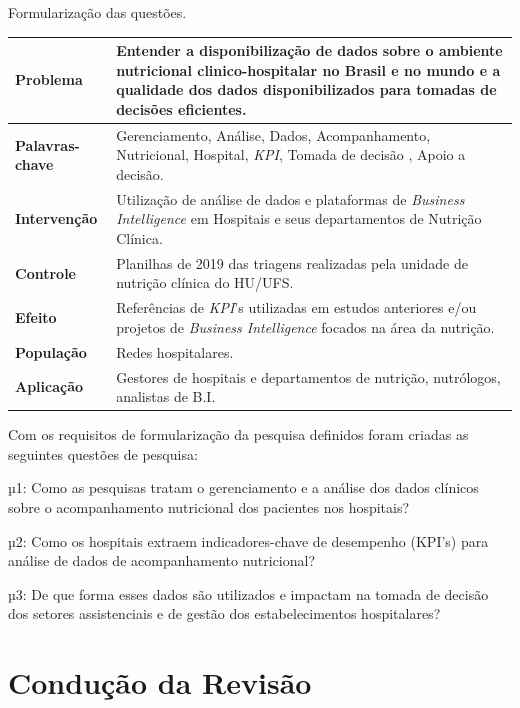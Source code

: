 \begin{quadro}[htb]
\caption{\label{quadro_formularizacaoPergunta}Formularização das questões.}
\label{}
\begin{tabular}{|p{3cm}|p{8cm}|}
	\hline
	\textbf{Problema}       & Entender a disponibilização de dados sobre o ambiente nutricional clinico-hospitalar no Brasil e no mundo e a qualidade dos dados disponibilizados para tomadas de decisões eficientes.  \\ \hline
	\textbf{Palavras-chave} & Gerenciamento, Análise, Dados, Acompanhamento, Nutricional, Hospital, \textit{KPI}, Tomada de decisão , Apoio a decisão.   \\ \hline
	\textbf{Intervenção}    & Utilização de análise de dados e plataformas de \textit{Business Intelligence} em Hospitais e seus departamentos de Nutrição Clínica.   \\ \hline
	\textbf{Controle}       & Planilhas de 2019 das triagens realizadas pela unidade de nutrição clínica do HU/UFS.
 \\ \hline
	\textbf{Efeito}         & Referências de \textit{KPI}’s utilizadas em estudos anteriores e/ou projetos de \textit{Business Intelligence} focados na área da nutrição. \\ \hline
	\textbf{População}      & Redes hospitalares. \\ \hline
	\textbf{Aplicação}      & Gestores de hospitais e departamentos de nutrição, nutrólogos, analistas de B.I.\\ \hline
\end{tabular}
\end{quadro}

Com os requisitos de formularização da pesquisa definidos foram criadas as seguintes questões de pesquisa:

µ1: Como as pesquisas tratam o gerenciamento e a análise dos dados clínicos sobre o acompanhamento nutricional dos pacientes nos hospitais?

µ2: Como os hospitais extraem indicadores-chave de desempenho (KPI’s) para análise de dados de acompanhamento nutricional?

µ3: De que forma esses dados são utilizados e impactam na tomada de decisão dos setores assistenciais e de gestão dos estabelecimentos hospitalares?


\section{Condução da Revisão}

